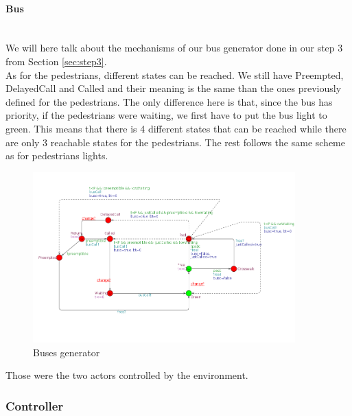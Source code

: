 \paragraph{Bus} \mbox{}\\
We will here talk about the mechanisms of our bus generator done in our step 3 from Section \ref{sec:step3}. \\
As for the pedestrians, different states can be reached. We still have Preempted, DelayedCall and Called and their meaning is the same than the ones previously defined for the pedestrians. The only difference here is that, since the bus has priority, if the pedestrians were waiting, we first have to put the bus light to green. This means that there is 4 different states that can be reached while there are only 3 reachable states for the pedestrians. The rest follows the same scheme as for pedestrians lights.

\begin{figure}[H]\label{fig:bus}
  \centering
    \includegraphics[width=0.9\textwidth]{picture/bus.png}
    \caption{Buses generator}
\end{figure}

\noindent Those were the two actors controlled by the environment.
\newpage
\subsubsection{Controller}
